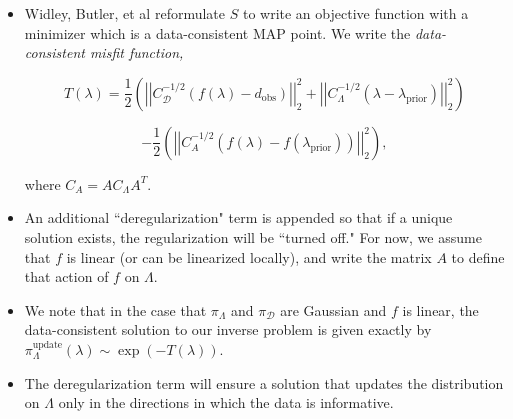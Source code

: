 \documentclass[11pt]{beamer}
\begin{document}
\begin{frame}

\begin{itemize}

	\item Widley, Butler, et al reformulate $S$ to write an objective function with a minimizer which is a data-consistent MAP point. We write the \textit{data-consistent misfit function,}
	
	
	
$$T(\lambda)=\frac{1}{2}\left(\left|\left|C_\mathcal{D}^{-1/2}(f(\lambda)-d_{\text{obs}})\right|\right|_2^2+\left|\left|C_\Lambda^{-1/2}(\lambda-\lambda_{\text{prior}})\right|\right|_2^2\right)$$
	

\begin{equation} \label{eq:3}
-\frac{1}{2}\left(\left|\left|C_A^{-1/2}(f(\lambda)-f(\lambda_{\text{prior}}))\right|\right|_2^2\right),
\end{equation} 

\noindent where $C_A=AC_\Lambda A^T$. 
	
	\item An additional ``deregularization" term is appended so that if a unique solution exists, the regularization will be ``turned off." For now, we assume that $f$ is linear (or can be linearized locally), and write the matrix $A$ to define that action of $f$ on $\Lambda$. 





\end{itemize}

\end{frame}


\begin{frame}



\begin{itemize}

	\item We note that in the case that $\pi_\Lambda$ and $\pi_\mathcal{D}$ are Gaussian and $f$ is linear, the data-consistent solution to our inverse problem is given exactly by $\pi_\Lambda^\text{update}(\lambda)\sim \exp(-T(\lambda))$. 

	\item The deregularization term will ensure a solution that updates the distribution on $\Lambda$ only in the directions in which the data is informative. 



\end{itemize}



\end{frame}
\end{document}
